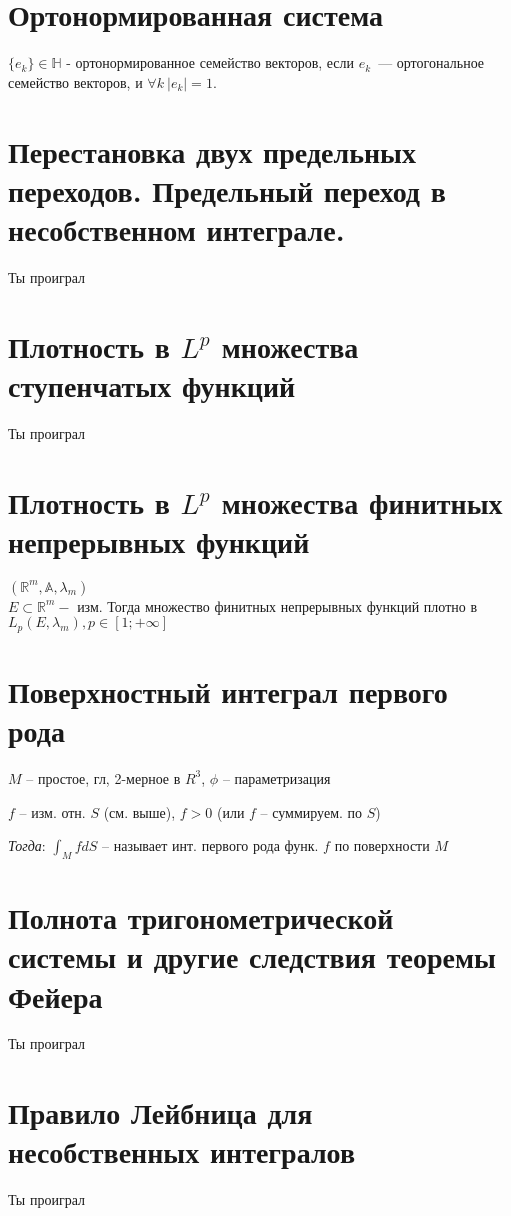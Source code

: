 \documentclass[paper=a4, fontsize=14pt]{article}
\begin{document}
\section{Ортонормированная система}
$\{e_k\} \in \mathds{H}$ - ортонормированное семейство векторов, если ${e_k}$~--- ортогональное семейство векторов, и $\forall k ~ |e_k| = 1$.

\section{Перестановка двух предельных переходов. Предельный переход в несобственном интеграле.}
Ты проиграл

\section{Плотность в $L^p$ множества ступенчатых функций}
Ты проиграл

\section{Плотность в $L^p$ множества финитных непрерывных функций}
$(\mathbb{R}^m, \mathbb{A}, \lambda_m)$\\

$E \subset \mathbb{R}^m -$ изм. Тогда множество финитных непрерывных функций плотно в $L_p(E, \lambda_m), p \in [1; +\infty]$\\

\section{Поверхностный интеграл первого рода}

$ M $ -- простое, гл, 2-мерное в $ R^3 $, $ \phi $ -- параметризация

$ f $ -- изм. отн. $S$ (см. выше), $ f > 0 $ (или $ f $ -- суммируем. по $ S $)

\emph{Тогда}: $ \int_M f dS$ -- называет инт. первого рода функ. $ f $ по поверхности $M$

\section{Полнота тригонометрической системы и другие следствия теоремы Фейера}
Ты проиграл

\section{Правило Лейбница для несобственных интегралов}
Ты проиграл
\end{document}
